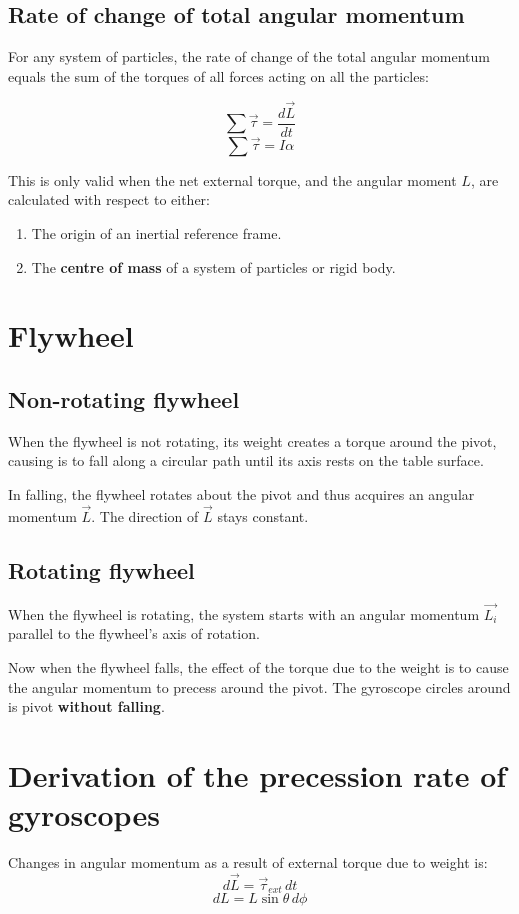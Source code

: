 \documentclass[11pt]{article}
\begin{document}
\newpage
\subsection{Rate of change of total angular momentum}
\label{sec:org3b5d553}
For any system of particles, the rate of change of the total angular momentum equals the sum of the torques of all forces acting on all the particles:

\[\sum \vec{\tau} = \frac{d \vec{L}}{dt}\]
\[\sum \vec{\tau} = I \alpha\]

This is only valid when the net external torque, and the angular moment \(L\), are calculated with respect to either:
\begin{enumerate}
\item The origin of an inertial reference frame.
\item The \textbf{centre of mass} of a system of particles or rigid body.
\end{enumerate}
\section{Flywheel}
\label{sec:org5fe6686}

\subsection{Non-rotating flywheel}
\label{sec:org16e3367}
When the flywheel is not rotating, its weight creates a torque around the pivot, causing is to fall along a circular path until its axis rests on the table surface.


In falling, the flywheel rotates about the pivot and thus acquires an angular momentum \(\vec{L}\). The direction of \(\vec{L}\) stays constant.
\subsection{Rotating flywheel}
\label{sec:orgda2ba0e}
When the flywheel is rotating, the system starts with an angular momentum \(\vec{L_i}\) parallel to the flywheel's axis of rotation.


Now when the flywheel falls, the effect of the torque due to the weight is to cause the angular momentum to precess around the pivot. The gyroscope circles around is pivot \textbf{without falling}.

\newpage
\section{Derivation of the precession rate of gyroscopes}
\label{sec:org1b71bc8}
Changes in angular momentum as a result of external torque due to weight is:
\[d \vec{L} = \vec{\tau}_{ext} \, dt\]
\[dL = L \sin \theta \, d \phi\]
\end{document}
